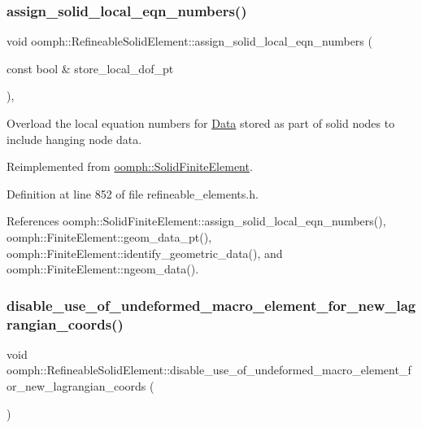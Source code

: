 \subsubsection{\texorpdfstring{assign\+\_\+solid\+\_\+local\+\_\+eqn\+\_\+numbers()}{assign\_solid\_local\_eqn\_numbers()}}
{\footnotesize\ttfamily void oomph\+::\+Refineable\+Solid\+Element\+::assign\+\_\+solid\+\_\+local\+\_\+eqn\+\_\+numbers (\begin{DoxyParamCaption}\item[{const bool \&}]{store\+\_\+local\+\_\+dof\+\_\+pt }\end{DoxyParamCaption})\hspace{0.3cm}{\ttfamily [inline]}, {\ttfamily [virtual]}}



Overload the local equation numbers for \hyperlink{classoomph_1_1Data}{Data} stored as part of solid nodes to include hanging node data. 



Reimplemented from \hyperlink{classoomph_1_1SolidFiniteElement_a3c7ad30f234e87649ed34cea94f65ea3}{oomph\+::\+Solid\+Finite\+Element}.



Definition at line 852 of file refineable\+\_\+elements.\+h.



References oomph\+::\+Solid\+Finite\+Element\+::assign\+\_\+solid\+\_\+local\+\_\+eqn\+\_\+numbers(), oomph\+::\+Finite\+Element\+::geom\+\_\+data\+\_\+pt(), oomph\+::\+Finite\+Element\+::identify\+\_\+geometric\+\_\+data(), and oomph\+::\+Finite\+Element\+::ngeom\+\_\+data().

\mbox{\label{classoomph_1_1RefineableSolidElement_a1d85edf9f84720ac0de66427d75a5871}} 
\subsubsection{\texorpdfstring{disable\+\_\+use\+\_\+of\+\_\+undeformed\+\_\+macro\+\_\+element\+\_\+for\+\_\+new\+\_\+lagrangian\+\_\+coords()}{disable\_use\_of\_undeformed\_macro\_element\_for\_new\_lagrangian\_coords()}}
{\footnotesize\ttfamily void oomph\+::\+Refineable\+Solid\+Element\+::disable\+\_\+use\+\_\+of\+\_\+undeformed\+\_\+macro\+\_\+element\+\_\+for\+\_\+new\+\_\+lagrangian\+\_\+coords (\begin{DoxyParamCaption}{ }\end{DoxyParamCaption})\hspace{0.3cm}{\ttfamily [inline]}}




